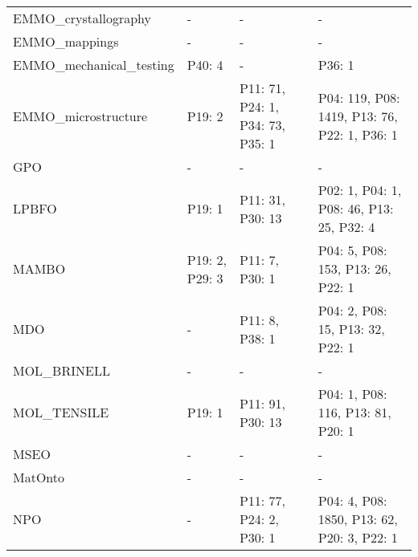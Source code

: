 \begin{tabular}{m{4cm}m{3cm}m{3cm}m{5cm}}
   EMMO_crystallography &                       - &                                                        - &                                                 - \\
          EMMO_mappings &                       - &                                                        - &                                                 - \\
EMMO_mechanical_testing &                  P40: 4 &                                                        - &                                            P36: 1 \\
    EMMO_microstructure &                  P19: 2 &                         P11: 71, P24: 1, P34: 73, P35: 1 &      P04: 119, P08: 1419, P13: 76, P22: 1, P36: 1 \\
                    GPO &                       - &                                                        - &                                                 - \\
                  LPBFO &                  P19: 1 &                                         P11: 31, P30: 13 &          P02: 1, P04: 1, P08: 46, P13: 25, P32: 4 \\
                  MAMBO &          P19: 2, P29: 3 &                                           P11: 7, P30: 1 &                 P04: 5, P08: 153, P13: 26, P22: 1 \\
                    MDO &                       - &                                           P11: 8, P38: 1 &                  P04: 2, P08: 15, P13: 32, P22: 1 \\
            MOL_BRINELL &                       - &                                                        - &                                                 - \\
            MOL_TENSILE &                  P19: 1 &                                         P11: 91, P30: 13 &                 P04: 1, P08: 116, P13: 81, P20: 1 \\
                   MSEO &                       - &                                                        - &                                                 - \\
                MatOnto &                       - &                                                        - &                                                 - \\
                    NPO &                       - &                                  P11: 77, P24: 2, P30: 1 &        P04: 4, P08: 1850, P13: 62, P20: 3, P22: 1 \\

\end{tabular}
